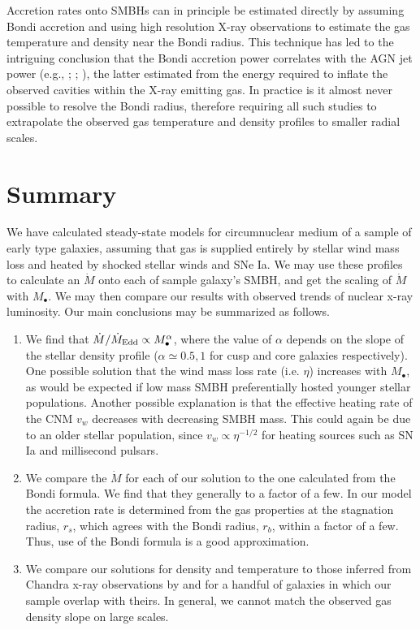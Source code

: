 \documentclass[usenatbib,fleqn]{mn2e}
\newcommand{\Mdot}{\dot{M}}
\newcommand{\eddr}{\dot{M}/\dot{M}_{\rm Edd}}
\newcommand{\rs}{r_s}
\newcommand{\rb}{r_b}
\newcommand{\Mbh}[1][]{M_{\bullet#1}}
\begin{document}
Accretion rates onto SMBHs can in principle be estimated directly by assuming Bondi accretion and using high resolution X-ray observations to estimate the gas temperature and density near the Bondi radius.  This technique has led to the intriguing conclusion that the Bondi accretion power correlates with the AGN jet power (e.g.,
\citealt{AllenDunn+:2006a}; \citealt{Russell+13};
\citealt{FujitaKawakatu+:2014a}), the latter estimated from the energy
required to inflate the observed cavities within the X-ray emitting
gas.  In practice is it almost never possible to resolve the Bondi radius, therefore requiring all such studies to extrapolate the observed gas temperature and density profiles to smaller radial scales.  


  \section{Summary}
  \label{sec:summary}
  We have calculated steady-state models for circumnuclear medium of a
  sample of early type galaxies, assuming that gas is supplied
  entirely by stellar wind mass loss and heated by shocked stellar
  winds and SNe Ia. We may use these profiles to calculate an $\Mdot$
  onto each of sample galaxy's SMBH, and get the scaling of $\Mdot$
  with $\Mbh$. We may then compare our results with observed trends of
  nuclear x-ray luminosity. Our main conclusions may be summarized as
  follows.

  \begin{enumerate}
  \item We find that $\eddr \propto \Mbh^{\alpha}$, where the value of
    $\alpha$ depends on the slope of the stellar density profile
    ($\alpha\simeq0.5,1$ for cusp and core galaxies respectively). One
    possible solution that the wind mass loss rate (i.e. $\eta$)
    increases with $\Mbh$, as would be expected if low mass SMBH
    preferentially hosted younger stellar populations. Another possible
    explanation is that the effective heating rate of the CNM $v_{w}$
    decreases with decreasing SMBH mass. This could again be due to an
    older stellar population, since $v_{w} \propto \eta^{−1/2}$
    for heating sources such as SN Ia and millisecond pulsars.
  \item We compare the $\Mdot$ for each of our solution to the one
    calculated from the Bondi formula. We find that they generally to
    a factor of a few. In our model the accretion rate is determined
    from the gas properties at the stagnation radius, $\rs$, which
    agrees with the Bondi radius, $\rb$, within a factor of a
    few. Thus, use of the Bondi formula is a good approximation.
  \item We compare our solutions for density and temperature to those
    inferred from Chandra x-ray observations by \citet{AllenDunn+:2006a}
    and \citet{RussellMcNamara+:2013a} for a handful of galaxies in
    which our sample overlap with theirs. In general, we cannot match
    the observed gas density slope on large scales. 
  \end{enumerate}
  
\end{document}
